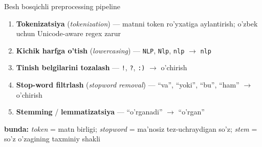 \documentclass[aspectratio=169,11pt]{beamer}
\newcommand{\bunda}[1]{{\small\textbf{bunda:}\; #1}}
\begin{document}
\begin{frame}{Besh bosqichli preprocessing pipeline}
  \begin{tcolorbox}[defbox,title=Ta'rif: Preprocessing pipeline]
    \small
    \begin{enumerate}\setlength\itemsep{3pt}
      \item \textbf{Tokenizatsiya} (\textit{tokenization}) ---
            matnni token ro'yxatiga aylantirish;
            o'zbek uchun Unicode-aware regex zarur
      \item \textbf{Kichik harfga o'tish} (\textit{lowercasing}) ---
            \texttt{NLP}, \texttt{Nlp}, \texttt{nlp} $\to$ \texttt{nlp}
      \item \textbf{Tinish belgilarini tozalash} ---
            \texttt{!}, \texttt{?}, \texttt{:)} $\to$ o'chirish
      \item \textbf{Stop-word filtrlash} (\textit{stopword removal}) ---
            ``va'', ``yoki'', ``bu'', ``ham'' $\to$ o'chirish
      \item \textbf{Stemming} / \textbf{lemmatizatsiya} ---
            ``o'rganadi'' $\to$ ``o'rgan''
    \end{enumerate}
  \end{tcolorbox}
  \vspace{4pt}
  \bunda{%
    \textit{token} = matn birligi;
    \textit{stopword} = ma'nosiz tez-uchraydigan so'z;
    \textit{stem} = so'z o'zagining taxminiy shakli
  }
\end{frame}
\end{document}
